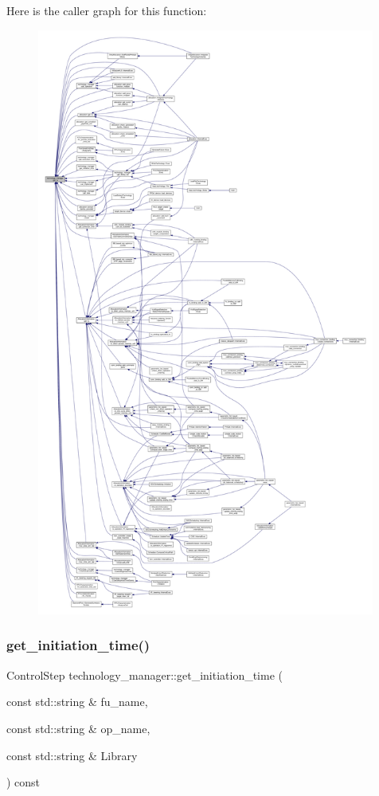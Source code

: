 Here is the caller graph for this function\+:
\nopagebreak
\begin{figure}[H]
\begin{center}
\leavevmode
\includegraphics[height=550pt]{df/dc7/classtechnology__manager_ad77d7800d227bbb41c5206d4c2f30260_icgraph}
\end{center}
\end{figure}
\mbox{\label{classtechnology__manager_a3ecefabcf1bf5c310eb41ceaca891420}} 
\subsubsection{\texorpdfstring{get\+\_\+initiation\+\_\+time()}{get\_initiation\_time()}}
{\footnotesize\ttfamily Control\+Step technology\+\_\+manager\+::get\+\_\+initiation\+\_\+time (\begin{DoxyParamCaption}\item[{const std\+::string \&}]{fu\+\_\+name,  }\item[{const std\+::string \&}]{op\+\_\+name,  }\item[{const std\+::string \&}]{Library }\end{DoxyParamCaption}) const}



